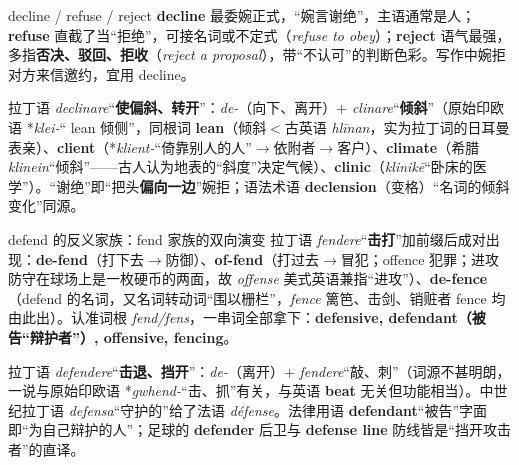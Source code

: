 \documentclass[../main.tex]{subfiles}
\begin{document}
\begin{lex}{decline / refuse / reject}
\textbf{decline} 最委婉正式，“婉言谢绝”，主语通常是人；\textbf{refuse} 直截了当“拒绝”，可接名词或不定式（\textit{refuse to obey}）；\textbf{reject} 语气最强，多指\textbf{否决、驳回、拒收}（\textit{reject a proposal}），带“不认可”的判断色彩。写作中婉拒对方来信邀约，宜用 decline。
\end{lex}

\begin{origin}
拉丁语 \textit{declinare}“\textbf{使偏斜、转开}”：\textit{de-}（向下、离开）+ \textit{clinare}“\textbf{倾斜}”（原始印欧语 *\textit{klei-}“ lean 倾侧”，同根词 \textbf{lean}（倾斜$<$古英语 \textit{hlīnan}，实为拉丁词的日耳曼表亲）、\textbf{client}（*\textit{klient-}“倚靠别人的人”$\to$依附者$\to$客户）、\textbf{climate}（希腊 \textit{klinein}“倾斜”——古人认为地表的“斜度”决定气候）、\textbf{clinic}（\textit{klinikē}“卧床的医学”）。“谢绝”即“把头\textbf{偏向一边}”婉拒；语法术语 \textbf{declension}（变格）“名词的倾斜变化”同源。
\end{origin}




\begin{gram}{defend 的反义家族：fend 家族的双向演变}
拉丁语 \textit{fendere}“\textbf{击打}”加前缀后成对出现：\textbf{de-fend}（打下去$\to$防御）、\textbf{of-fend}（打过去$\to$冒犯；offence 犯罪；进攻\/防守在球场上是一枚硬币的两面，故 \textit{offense} 美式英语兼指“进攻”）、\textbf{de-fence}（defend 的名词，又名词转动词“围以栅栏”，\textit{fence} 篱笆、击剑、销赃者 fence 均由此出）。认准词根 \textit{fend/fens}，一串词全部拿下：\textbf{defensive, defendant（被告“辩护者”）, offensive, fencing}。
\end{gram}

\begin{origin}
拉丁语 \textit{defendere}“\textbf{击退、挡开}”：\textit{de-}（离开）+ \textit{fendere}“敲、刺”（词源不甚明朗，一说与原始印欧语 *\textit{gwhend-}“击、抓”有关，与英语 \textbf{beat} 无关但功能相当）。中世纪拉丁语 \textit{defensa}“守护的”给了法语 \textit{défense}。法律用语 \textbf{defendant}“被告”字面即“为自己辩护的人”；足球的 \textbf{defender} 后卫与 \textbf{defense line} 防线皆是“挡开攻击者”的直译。
\end{origin}
\end{document}
